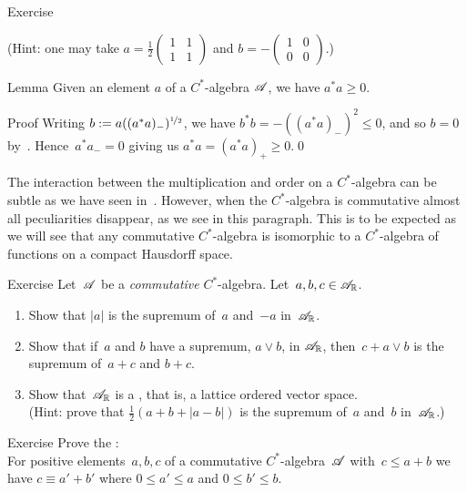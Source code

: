 \documentclass[main]{subfiles}
\begin{document}
\begin{parsec}
\begin{point}{Exercise}
\begin{enumerate}
(Hint: one may take  
$a=\frac{1}{2}\left(\begin{smallmatrix}1 & 1 \\ 1 & 1\end{smallmatrix}\right)$
and $b=-\left(\begin{smallmatrix}1 & 0 \\ 0 & 0 \end{smallmatrix}\right)$.)
\end{enumerate}
\end{point}
\begin{point}{Lemma}%
Given an element $a$ of a $C^*$-algebra $\mathscr{A}$,
we have $a^*a\geq 0$.
\begin{point}{Proof}%
Writing $b:=a((a^*a)_-)^{\nicefrac{1}{2}}$,
we have $b^*b=-((a^*a)_-)^2\leq 0$,
and so $b=0$ by~.
Hence~$a^*a_-=0$ giving us $a^*a=(a^*a)_+\geq 0$.\qed
\end{point}
\end{point}
\end{parsec}

\begin{parsec}%
\begin{point}%
The interaction between the multiplication and order
on a $C^*$-algebra can be subtle
as we have seen in~\TODO{}.  However,
when the $C^*$-algebra is commutative
almost all peculiarities disappear,
as we see in this paragraph.
This is to be expected
as we will see that any commutative $C^*$-algebra
is isomorphic to a $C^*$-algebra
of functions on a compact Hausdorff space.
\end{point}
\begin{point}{Exercise}%
Let~$\mathscr{A}$ be a \emph{commutative} $C^*$-algebra.
Let~$a,b,c\in\mathscr{A}_{\mathbb{R}}$.
\begin{enumerate}
\item
Show that $\left| a\right|$ is the supremum of~$a$ and~$-a$
in~$\mathscr{A}_{\mathbb{R}}$.
\item
Show that if~$a$ and $b$ have a supremum, $a\vee b$, in $\mathscr{A}_{\mathbb{R}}$,
then~$c+a\vee b$ is the supremum of~$a+c$ and $b+c$.
\item
Show that~$\mathscr{A}_{\mathbb{R}}$ is a ,
that is,  a lattice ordered vector space.\\
(Hint: prove that $\frac{1}{2}(a+b+\left|a-b\right|)$
is the supremum of~$a$ and~$b$ in~$\mathscr{A}_{\mathbb{R}}$.)
\end{enumerate}
\end{point}
\begin{point}{Exercise}%
Prove the :\\
For positive elements~$a,b,c$ of a commutative $C^*$-algebra~$\mathscr{A}$
with~$c\leq a+b$
we have $c\equiv a'+b'$
where  $0\leq a'\leq a$ and $0\leq b'\leq b$.
\end{point}
\end{parsec}
\end{document}
